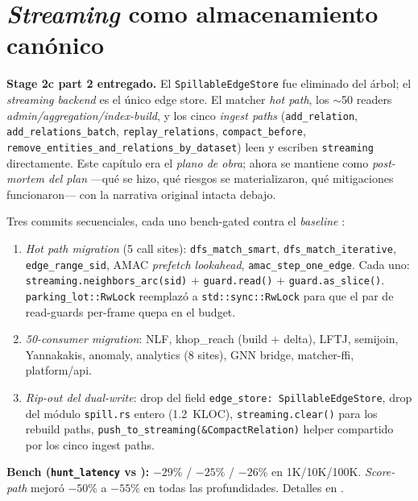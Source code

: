 \chapter{\emph{Streaming} como almacenamiento canónico}
\label{cap:streaming-canonical}

\begin{intuicion}
\textbf{Stage 2c part 2 entregado.} El \texttt{SpillableEdgeStore}
fue eliminado del árbol; el \emph{streaming backend} es el único
edge store. El matcher \emph{hot path}, los $\sim$50 readers
\emph{admin/aggregation/index-build}, y los cinco \emph{ingest
paths} (\texttt{add\_relation}, \texttt{add\_relations\_batch},
\texttt{replay\_relations}, \texttt{compact\_before},
\texttt{remove\_entities\_and\_relations\_by\_dataset}) leen y
escriben \texttt{streaming} directamente. Este capítulo era el
\emph{plano de obra}; ahora se mantiene como \emph{post-mortem
del plan} ---qué se hizo, qué riesgos se materializaron, qué
mitigaciones funcionaron--- con la narrativa original intacta
debajo.
\end{intuicion}

\begin{nota}
Tres commits secuenciales, cada uno bench-gated contra el
\emph{baseline} :
\begin{enumerate}
  \item \emph{Hot path migration} (5 call sites): \texttt{dfs\_match\_smart},
  \texttt{dfs\_match\_iterative}, \texttt{edge\_range\_sid},
  AMAC \emph{prefetch lookahead}, \texttt{amac\_step\_one\_edge}.
  Cada uno: \texttt{streaming.neighbors\_arc(sid)} \(+\)
  \texttt{guard.read()} \(+\) \texttt{guard.as\_slice()}.
  \texttt{parking\_lot::RwLock} reemplazó a
  \texttt{std::sync::RwLock} para que el par de read-guards
  per-frame quepa en el budget.
  \item \emph{50-consumer migration}: NLF, khop\_reach (build +
  delta), LFTJ, semijoin, Yannakakis, anomaly, analytics
  (8 sites), GNN bridge, matcher-ffi, platform/api.
  \item \emph{Rip-out del dual-write}: drop del field
  \texttt{edge\_store: SpillableEdgeStore}, drop del módulo
  \texttt{spill.rs} entero (1.2~KLOC), \texttt{streaming.clear()}
  para los rebuild paths, \texttt{push\_to\_streaming(\&CompactRelation)}
  helper compartido por los cinco ingest paths.
\end{enumerate}
\textbf{Bench (\texttt{hunt\_latency} vs ):}
\(-29\)\% / \(-25\)\% / \(-26\)\% en 1K/10K/100K. \emph{Score-path}
mejoró \(-50\)\% a \(-55\)\% en todas las profundidades. Detalles
en .
\end{nota}

